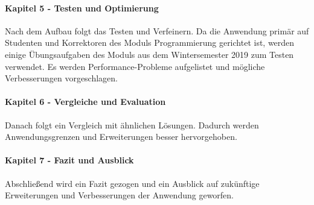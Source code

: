 \paragraph{Kapitel 5 - Testen und Optimierung} Nach dem Aufbau folgt das Testen und Verfeinern.
Da die Anwendung primär auf Studenten und Korrektoren des Moduls Programmierung gerichtet ist,
werden einige Übungsaufgaben des Moduls aus dem Wintersemester 2019 zum Testen verwendet.
Es werden Performance-Probleme aufgelistet und mögliche Verbesserungen vorgeschlagen.

\paragraph{Kapitel 6 - Vergleiche und Evaluation} Danach folgt ein Vergleich mit ähnlichen Lösungen.
Dadurch werden Anwendungsgrenzen und Erweiterungen besser hervorgehoben.

\paragraph{Kapitel 7 - Fazit und Ausblick} Abschließend wird ein Fazit gezogen und ein Ausblick auf
zukünftige Erweiterungen und Verbesserungen der Anwendung geworfen.
